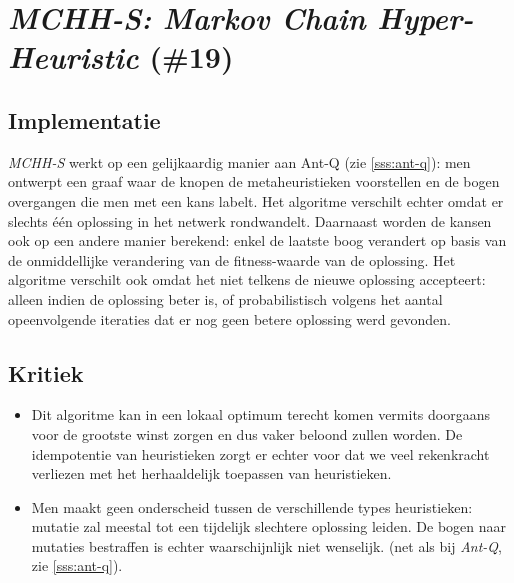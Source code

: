 \section{\emph{MCHH-S: Markov Chain Hyper-Heuristic} (\#19)}
\label{sss:mchh-s}
\subsection{Implementatie}
\emph{MCHH-S}\cite{chesc-mchh-s,conf/gecco/McClymontK11} werkt op een gelijkaardig manier aan Ant-Q (zie \ref{sss:ant-q}): men ontwerpt een graaf waar de knopen de metaheuristieken voorstellen en de bogen overgangen die men met een kans labelt. Het algoritme verschilt echter omdat er slechts \'e\'en oplossing in het netwerk rondwandelt. Daarnaast worden de kansen ook op een andere manier berekend: enkel de laatste boog verandert op basis van de onmiddellijke verandering van de fitness-waarde van de oplossing. Het algoritme verschilt ook omdat het niet telkens de nieuwe oplossing accepteert: alleen indien de oplossing beter is, of probabilistisch volgens het aantal opeenvolgende iteraties dat er nog geen betere oplossing werd gevonden.
\subsection{Kritiek}
\begin{itemize}
 \item Dit algoritme kan in een lokaal optimum terecht komen vermits \abls{} doorgaans voor de grootste winst zorgen en dus vaker beloond zullen worden. De idempotentie van \abls{} heuristieken zorgt er echter voor dat we veel rekenkracht verliezen met het herhaaldelijk toepassen van \abls{} heuristieken.
 \item Men maakt geen onderscheid tussen de verschillende types heuristieken: mutatie zal meestal tot een tijdelijk slechtere oplossing leiden. De bogen naar mutaties bestraffen is echter waarschijnlijk niet wenselijk. (net als bij \emph{Ant-Q}, zie \ref{sss:ant-q}).
\end{itemize}